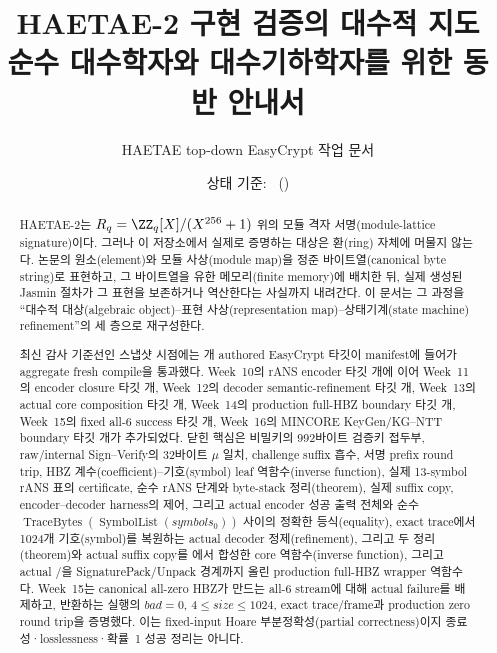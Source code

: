 \documentclass[11pt,a4paper]{article}
\title{\textbf{HAETAE-2 구현 검증의 대수적 지도}\\[0.4em]
  \Large 순수 대수학자와 대수기하학자를 위한 동반 안내서}
\author{HAETAE top-down EasyCrypt 작업 문서}
\date{상태 기준: \SnapshotDate\ (\SnapshotWeek)}
\begin{document}
\maketitle

\begin{abstract}
HAETAE-2는
\(R_q=\ZZ_q[X]/(X^{256}+1)\) 위의 모듈 격자 서명(module-lattice
signature)이다. 그러나 이 저장소에서 실제로 증명하는 대상은 환(ring) 자체에
머물지 않는다. 논문의 원소(element)와 모듈 사상(module map)을 정준
바이트열(canonical byte string)로 표현하고, 그 바이트열을 유한
메모리(finite memory)에 배치한 뒤, 실제 생성된
Jasmin 절차가 그 표현을 보존하거나 역산한다는 사실까지 내려간다. 이 문서는
그 과정을 ``대수적 대상(algebraic object)--표현 사상(representation
map)--상태기계(state machine) refinement''의 세 층으로
재구성한다.

최신 감사 기준선인 스냅샷 시점에는 \AuthoredTargetCount 개 authored
EasyCrypt 타깃이 manifest에 들어가 aggregate  fresh compile을
통과했다. Week~10의 rANS encoder 타깃 \WeekTenTargetCount 개에 이어
Week~11의 encoder closure 타깃 \WeekElevenTargetCount 개, Week~12의 decoder
semantic-refinement 타깃 \WeekTwelveTargetCount 개, Week~13의 actual core
composition 타깃 \WeekThirteenTargetCount 개, Week~14의 production full-HBZ
boundary 타깃 \WeekFourteenTargetCount 개, Week~15의 fixed all-6 success 타깃
\WeekFifteenTargetCount 개, Week~16의 MINCORE KeyGen/KG--NTT boundary 타깃
\WeekSixteenTargetCount 개가 추가되었다.
닫힌 핵심은 비밀키의
992바이트 검증키 접두부,
raw/internal Sign--Verify의 32바이트 \(\mu\) 일치, challenge suffix 흡수,
서명 prefix round trip, HBZ 계수(coefficient)--기호(symbol) leaf
역함수(inverse function), 실제 13-symbol rANS 표의
certificate, 순수 rANS 단계와 byte-stack 정리(theorem), 실제 suffix copy,
encoder--decoder harness의 제어, 그리고 actual encoder 성공 출력 전체와 순수
\(\operatorname{TraceBytes}(\operatorname{SymbolList}(symbols_0))\) 사이의 정확한
등식(equality), exact trace에서 1024개 기호(symbol)를 복원하는 actual decoder
정제(refinement), 그리고 두 정리(theorem)와 actual suffix copy를
에서 합성한 core 역함수(inverse function),
그리고 actual /을
SignaturePack/Unpack 경계까지 올린 production full-HBZ wrapper 역함수다. Week~15는
canonical all-zero HBZ가 만드는 all-6 stream에 대해 actual failure를 배제하고,
반환하는 실행의 \(bad=0\), \(4\le size\le1024\), exact trace/frame과 production
zero round trip을 증명했다. 이는 fixed-input Hoare 부분정확성(partial
correctness)이지 종료성·losslessness·확률~1 성공 정리는 아니다.


\end{abstract}
\end{document}
